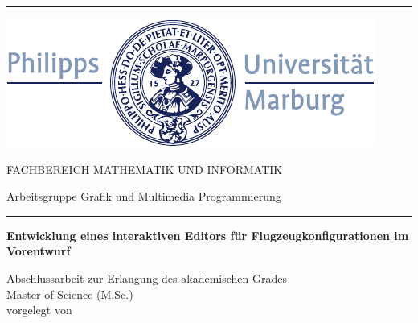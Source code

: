 \begin{titlepage}
	
\vspace{0.3cm} \noindent\rule{\textwidth}{0.5mm} \vspace{-0.3cm}	
	
\begin{minipage}{19mm} 
    \includegraphics{fig/siegel_uni.pdf} 
\end{minipage}
	\hfill	
\begin{minipage}{85mm}	
	\sffamily
	
\begin{flushright}
	\scriptsize FACHBEREICH MATHEMATIK UND INFORMATIK

	\vspace{0.25cm}
	
	\scriptsize Arbeitsgruppe Grafik und Multimedia Programmierung
\end{flushright}

\end{minipage}	
 
	
	\vspace{0.3cm} \noindent\rule{\textwidth}{0.1mm}\vspace{1cm}
	\rmfamily\normalsize	



\begin{center}
\Large{\textsf{\textbf{Entwicklung eines interaktiven Editors f\"ur Flugzeugkonfigurationen im Vorentwurf}}}
 
\vspace{1em}
 
\large{\textsf{Abschlussarbeit zur Erlangung des akademischen Grades}} \\
\Large{\textsf{Master of Science (M.Sc.)}} \\
\large{\textsf{vorgelegt von}}
 
\vspace{0.5em}
 

\end{center}
\end{titlepage}
